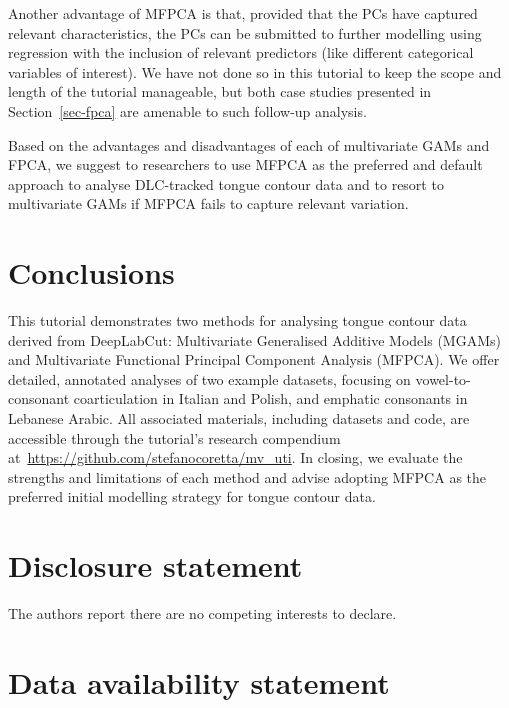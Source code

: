 \documentclass[
  man,
  longtable,
  nolmodern,
  notxfonts,
  notimes,
  colorlinks=true,linkcolor=blue,citecolor=blue,urlcolor=blue]{apa7}
\begin{document}
Another advantage of MFPCA is that, provided that the PCs have captured
relevant characteristics, the PCs can be submitted to further modelling
using regression with the inclusion of relevant predictors (like
different categorical variables of interest). We have not done so in
this tutorial to keep the scope and length of the tutorial manageable,
but both case studies presented in Section~\ref{sec-fpca} are amenable
to such follow-up analysis.

Based on the advantages and disadvantages of each of multivariate GAMs
and FPCA, we suggest to researchers to use MFPCA as the preferred and
default approach to analyse DLC-tracked tongue contour data and to
resort to multivariate GAMs if MFPCA fails to capture relevant
variation.

\section{Conclusions}\label{conclusions}

This tutorial demonstrates two methods for analysing tongue contour data
derived from DeepLabCut: Multivariate Generalised Additive Models
(MGAMs) and Multivariate Functional Principal Component Analysis
(MFPCA). We offer detailed, annotated analyses of two example datasets,
focusing on vowel-to-consonant coarticulation in Italian and Polish, and
emphatic consonants in Lebanese Arabic. All associated materials,
including datasets and code, are accessible through the tutorial's
research compendium at~\url{https://github.com/stefanocoretta/mv_uti}.
In closing, we evaluate the strengths and limitations of each method and
advise adopting MFPCA as the preferred initial modelling strategy for
tongue contour data.

\section*{Disclosure statement}\label{disclosure-statement}

The authors report there are no competing interests to declare.

\section*{\texorpdfstring{\textbf{Data availability
statement}}{Data availability statement}}\label{data-availability-statement}
\end{document}
